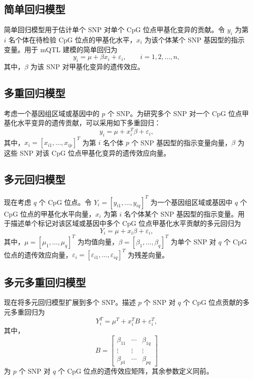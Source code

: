 \subsection{简单回归模型}

简单回归模型用于估计单个 SNP 对单个 CpG 位点甲基化变异的贡献。令 $y_i$ 为第 $i$ 名个体在待检验 CpG 位点的甲基化水平，$x_i$ 为该个体某个 SNP 基因型的指示变量。用于 mQTL 建模的简单回归为
\[
y_i=\mu+\beta x_i+\varepsilon_i,\qquad i=1,2,\ldots,n,
\]
其中，$\beta$ 为该 SNP 对甲基化变异的遗传效应。

\subsection{多重回归模型}

考虑一个基因组区域或基因中的 $p$ 个 SNP。为研究多个 SNP 对一个 CpG 位点甲基化水平变异的遗传贡献，可以采用如下多重回归：
\[
y_i=\mu+x_i^T\beta+\varepsilon_i,
\]
其中，$x_i=[x_{i1},\ldots,x_{ip}]^T$ 为第 $i$ 名个体 $p$ 个 SNP 基因型的指示变量向量，$\beta$ 为这些 SNP 对该 CpG 位点甲基化变异的遗传效应向量。

\subsection{多元回归模型}

现在考虑 $q$ 个 CpG 位点。令 $Y_i=[y_{i1},\ldots,y_{iq}]^T$ 为一个基因组区域或基因中 $q$ 个 CpG 位点的甲基化水平向量，$x_i$ 为第 $i$ 名个体某个 SNP 基因型的指示变量。用于描述单个标记对该区域或基因中多个 CpG 位点甲基化水平贡献的多元回归为
\[
Y_i=\mu+x_i\beta+\varepsilon_i,
\]
其中，$\mu=[\mu_1,\ldots,\mu_q]^T$ 为均值向量，$\beta=[\beta_1,\ldots,\beta_q]^T$ 为单个 SNP 对 $q$ 个 CpG 位点的遗传效应向量，$\varepsilon_i=[\varepsilon_{i1},\ldots,\varepsilon_{iq}]^T$ 为残差向量。

\subsection{多元多重回归模型}

现在将多元回归模型扩展到多个 SNP。描述 $p$ 个 SNP 对 $q$ 个 CpG 位点贡献的多元多重回归为
\[
Y_i^T=\mu^T+x_i^TB+\varepsilon_i^T,
\]
其中，
\[
B=\begin{bmatrix}\beta_{11}&\cdots&\beta_{1q}\\\vdots&\vdots&\vdots\\\beta_{p1}&\cdots&\beta_{pq}\end{bmatrix}
\]
为 $p$ 个 SNP 对 $q$ 个 CpG 位点的遗传效应矩阵，其余参数定义同前。

